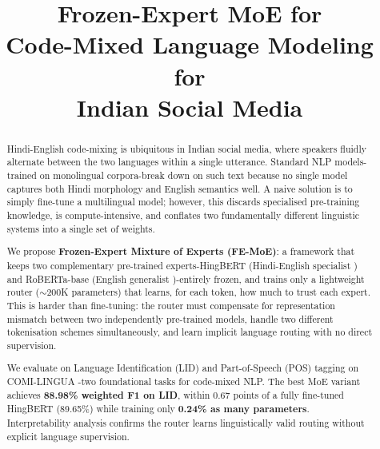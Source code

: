 \documentclass[conference]{IEEEtran}
\begin{document}
\title{Frozen-Expert MoE for\\Code-Mixed Language Modeling for\\Indian Social Media}

\author{
}

\maketitle

\begin{abstract}
Hindi-English code-mixing is ubiquitous in Indian social media, where speakers fluidly alternate between the two languages within a single utterance. Standard NLP models-trained on monolingual corpora-break down on such text because no single model captures both Hindi morphology and English semantics well. A naive solution is to simply fine-tune a multilingual model; however, this discards specialised pre-training knowledge, is compute-intensive, and conflates two fundamentally different linguistic systems into a single set of weights.

We propose \textbf{Frozen-Expert Mixture of Experts (FE-MoE)}: a framework that keeps two complementary pre-trained experts-HingBERT (Hindi-English specialist \cite{nayak2022hingbert}) and RoBERTa-base (English generalist \cite{liu2019roberta})-entirely frozen, and trains only a lightweight router ($\sim$200K parameters) that learns, for each token, how much to trust each expert. This is harder than fine-tuning: the router must compensate for representation mismatch between two independently pre-trained models, handle two different tokenisation schemes simultaneously, and learn implicit language routing with no direct supervision.

We evaluate on Language Identification (LID) and Part-of-Speech (POS) tagging on COMI-LINGUA \cite{sheth2024comilingua}-two foundational tasks for code-mixed NLP. The best MoE variant achieves \textbf{88.98\% weighted F1 on LID}, within 0.67 points of a fully fine-tuned HingBERT (89.65\%) while training only \textbf{0.24\% as many parameters}. Interpretability analysis confirms the router learns linguistically valid routing without explicit language supervision.
\end{abstract}
\end{document}
